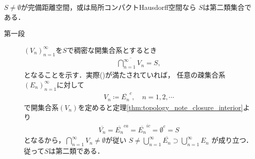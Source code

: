 	\begin{screen}
		\begin{thm}[Baire]\label{thm:Baire_category_theorem}
			$S \neq \emptyset$が完備距離空間，或は局所コンパクトHausdorff空間なら
			$S$は第二類集合である．
		\end{thm}
	\end{screen}
	
	\begin{prf}\mbox{}
		\begin{description}
			\item[第一段]
				$(V_n)_{n=1}^\infty$を$S$で稠密な開集合系とするとき
				\begin{align}
					\overline{\bigcap_{n=1}^\infty V_n} = S,
					\label{eq:thm_Baire_category_theorem_1}
				\end{align}
				となることを示す．実際()が満たされていれば，
				任意の疎集合系$(E_n)_{n=1}^\infty$に対して
				\begin{align}
					V_n \coloneqq \overline{E_n}^c,
					\quad n=1,2,\cdots
				\end{align}
				で開集合系$(V_n)$を定めると定理\ref{thm:topology_note_closure_interior}より
				\begin{align}
					\overline{V_n} = \overline{E_n}^{ca} = \overline{E_n}^{ic} = \emptyset^c = S
				\end{align}
				となるから，$\bigcap_{n=1}^\infty V_n \neq \emptyset$が従い
				$S \neq \bigcup_{n=1}^\infty \overline{E_n} \supset \bigcup_{n=1}^\infty E_n$
				が成り立つ．従って$S$は第二類である．
				

\end{description}
\end{prf}
